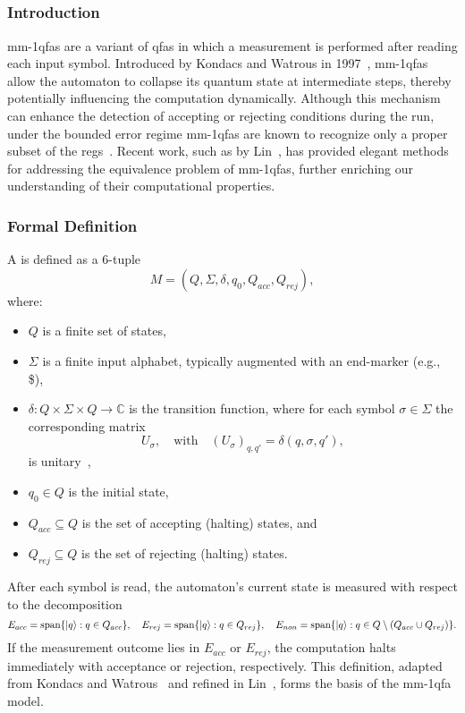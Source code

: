 \subsection{}
\label{sec:mmqfa}

\subsubsection{Introduction}
\glspl{mm-1qfa} are a variant of \glspl{qfa} in which a measurement is performed after reading each input symbol. Introduced by Kondacs and Watrous in 1997~\cite{kondacs1997power}, \glspl{mm-1qfa} allow the automaton to collapse its quantum state at intermediate steps, thereby potentially influencing the computation dynamically. Although this mechanism can enhance the detection of accepting or rejecting conditions during the run, under the bounded error regime \glspl{mm-1qfa} are known to recognize only a proper subset of the \glspl{reg}~\cite{brodsky2002characterizations}. Recent work, such as by Lin~\cite{lin2012another}, has provided elegant methods for addressing the equivalence problem of \glspl{mm-1qfa}, further enriching our understanding of their computational properties.

\subsubsection{Formal Definition}
A  is defined as a 6-tuple
\[
M = (Q,\Sigma,\delta,q_0,Q_{acc},Q_{rej}),
\]
where:
\begin{itemize}
    \item $Q$ is a finite set of states,
    \item $\Sigma$ is a finite input alphabet, typically augmented with an end-marker (e.g., \$),
    \item $\delta : Q \times \Sigma \times Q \to \mathbb{C}$ is the transition function, where for each symbol $\sigma\in\Sigma$ the corresponding matrix 
    \[
    U_\sigma,\quad \text{with} \quad (U_\sigma)_{q,q'}=\delta(q,\sigma,q'),
    \]
    is unitary~\cite{kondacs1997power},
    \item $q_0 \in Q$ is the initial state,
    \item $Q_{acc} \subseteq Q$ is the set of accepting (halting) states, and
    \item $Q_{rej} \subseteq Q$ is the set of rejecting (halting) states.
\end{itemize}
After each symbol is read, the automaton's current state is measured with respect to the decomposition
\[
E_{acc} = \text{span}\{\ket{q} : q \in Q_{acc}\},\quad
E_{rej} = \text{span}\{\ket{q} : q \in Q_{rej}\},\quad
E_{non} = \text{span}\{\ket{q} : q \in Q \setminus (Q_{acc}\cup Q_{rej})\}.
\]
If the measurement outcome lies in $E_{acc}$ or $E_{rej}$, the computation halts immediately with acceptance or rejection, respectively. This definition, adapted from Kondacs and Watrous~\cite{kondacs1997power} and refined in Lin~\cite{lin2012another}, forms the basis of the \gls{mm-1qfa} model.

